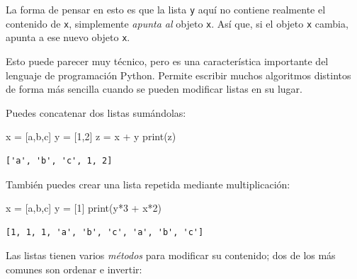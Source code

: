 \documentclass[
  letterpaper,
]{scrbook}
\newenvironment{Shaded}{\begin{snugshade}}{\end{snugshade}}
\newcommand{\BuiltInTok}[1]{\textcolor[rgb]{0.00,0.23,0.31}{#1}}
\newcommand{\DecValTok}[1]{\textcolor[rgb]{0.68,0.00,0.00}{#1}}
\newcommand{\NormalTok}[1]{\textcolor[rgb]{0.00,0.23,0.31}{#1}}
\newcommand{\OperatorTok}[1]{\textcolor[rgb]{0.37,0.37,0.37}{#1}}
\newcommand{\StringTok}[1]{\textcolor[rgb]{0.13,0.47,0.30}{#1}}
\begin{document}
La forma de pensar en esto es que la lista \texttt{y} aquí no contiene
realmente el contenido de \texttt{x}, simplemente \emph{apunta al}
objeto \texttt{x}. Así que, si el objeto \texttt{x} cambia, apunta a ese
nuevo objeto \texttt{x}.

Esto puede parecer muy técnico, pero es una característica importante
del lenguaje de programación Python. Permite escribir muchos algoritmos
distintos de forma más sencilla cuando se pueden modificar listas en su
lugar.

Puedes concatenar dos listas sumándolas:

\begin{Shaded}
\begin{Highlighting}[]
\NormalTok{x }\OperatorTok{=}\NormalTok{ [}\StringTok{\textquotesingle{}a\textquotesingle{}}\NormalTok{,}\StringTok{\textquotesingle{}b\textquotesingle{}}\NormalTok{,}\StringTok{\textquotesingle{}c\textquotesingle{}}\NormalTok{]}
\NormalTok{y }\OperatorTok{=}\NormalTok{ [}\DecValTok{1}\NormalTok{,}\DecValTok{2}\NormalTok{]}
\NormalTok{z }\OperatorTok{=}\NormalTok{ x }\OperatorTok{+}\NormalTok{ y}
\BuiltInTok{print}\NormalTok{(z)}
\end{Highlighting}
\end{Shaded}

\begin{verbatim}
['a', 'b', 'c', 1, 2]
\end{verbatim}

También puedes crear una lista repetida mediante multiplicación:

\begin{Shaded}
\begin{Highlighting}[]
\NormalTok{x }\OperatorTok{=}\NormalTok{ [}\StringTok{\textquotesingle{}a\textquotesingle{}}\NormalTok{,}\StringTok{\textquotesingle{}b\textquotesingle{}}\NormalTok{,}\StringTok{\textquotesingle{}c\textquotesingle{}}\NormalTok{]}
\NormalTok{y }\OperatorTok{=}\NormalTok{ [}\DecValTok{1}\NormalTok{]}
\BuiltInTok{print}\NormalTok{(y}\OperatorTok{*}\DecValTok{3} \OperatorTok{+}\NormalTok{ x}\OperatorTok{*}\DecValTok{2}\NormalTok{)}
\end{Highlighting}
\end{Shaded}

\begin{verbatim}
[1, 1, 1, 'a', 'b', 'c', 'a', 'b', 'c']
\end{verbatim}

Las listas tienen varios \emph{métodos} para modificar su contenido; dos
de los más comunes son ordenar e invertir:
\end{document}
